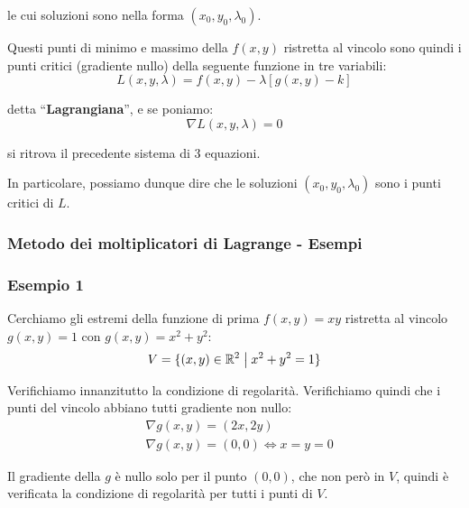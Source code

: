 le cui soluzioni sono nella forma \((x_0,y_0,\lambda_0)\).

\smallskip
Questi punti di minimo e massimo della \(f(x,y)\) ristretta al vincolo sono quindi i punti critici (gradiente nullo) della seguente funzione in tre variabili:
\[
    L(x,y,\lambda) = f(x,y) - \lambda [g(x,y) -k]
\]

detta ``\textbf{Lagrangiana}'', e se poniamo:
\[
    \nabla L(x,y,\lambda) = 0
\]

si ritrova il precedente sistema di 3 equazioni.

\smallskip
In particolare, possiamo dunque dire che le soluzioni \((x_0,y_0, \lambda_0)\) sono i punti critici di \(L\).

\pagebreak
\subsubsection{Metodo dei moltiplicatori di Lagrange {-} Esempi}

\subsubsection*{Esempio 1}

Cerchiamo gli estremi della funzione di prima \(f(x,y) = xy\) ristretta al vincolo \(g(x,y) = 1\) con \(g(x,y) = x^2+y^2\):
\[
    V= \{(x,y) \in \mathbb{R}^{2} \;\big|\; x^{2}+y^{2} = 1\}
\]

Verifichiamo innanzitutto la condizione di regolarità. Verifichiamo quindi che i punti del vincolo abbiano tutti gradiente non nullo:
\medskip
\begin{align*}
     & \nabla g(x,y) = (2x,2y)          \\
     & \nabla g(x,y) = (0,0) \iff x=y=0
\end{align*}

Il gradiente della \(g\) è nullo solo per il punto \((0,0)\), che non però in \(V\), quindi è verificata la condizione di regolarità per tutti i punti di \(V\).

